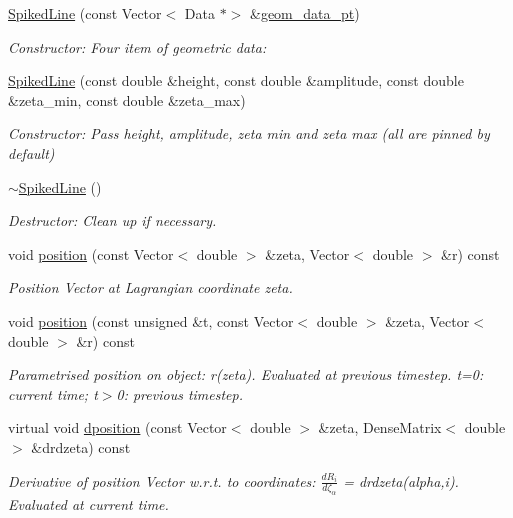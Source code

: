 \begin{DoxyCompactItemize}
\item 
\hyperlink{classSpikedLine_a79ca76b80aebb0b32f63c125aee9d04d}{Spiked\+Line} (const Vector$<$ Data $\ast$$>$ \&\hyperlink{classSpikedLine_abf25117b43790ca3a9afb826188bc5fc}{geom\+\_\+data\+\_\+pt})
\begin{DoxyCompactList}\small\item\em Constructor\+: Four item of geometric data\+: \end{DoxyCompactList}\item 
\hyperlink{classSpikedLine_ad007f4c54d091b1c4ddb4b63cef0e7b6}{Spiked\+Line} (const double \&height, const double \&amplitude, const double \&zeta\+\_\+min, const double \&zeta\+\_\+max)
\begin{DoxyCompactList}\small\item\em Constructor\+: Pass height, amplitude, zeta min and zeta max (all are pinned by default) \end{DoxyCompactList}\item 
\hyperlink{classSpikedLine_a54f1b8a7951ad8205741e78fc75afaa3}{$\sim$\+Spiked\+Line} ()
\begin{DoxyCompactList}\small\item\em Destructor\+: Clean up if necessary. \end{DoxyCompactList}\item 
void \hyperlink{classSpikedLine_a11a6078a409096caaf21dd56b97e1528}{position} (const Vector$<$ double $>$ \&zeta, Vector$<$ double $>$ \&r) const
\begin{DoxyCompactList}\small\item\em Position Vector at Lagrangian coordinate zeta. \end{DoxyCompactList}\item 
void \hyperlink{classSpikedLine_ac6356a30cad06346e46a494e226d5219}{position} (const unsigned \&t, const Vector$<$ double $>$ \&zeta, Vector$<$ double $>$ \&r) const
\begin{DoxyCompactList}\small\item\em Parametrised position on object\+: r(zeta). Evaluated at previous timestep. t=0\+: current time; t$>$0\+: previous timestep. \end{DoxyCompactList}\item 
virtual void \hyperlink{classSpikedLine_a8c7c95b0c572a33ca9206b01d10c99c5}{dposition} (const Vector$<$ double $>$ \&zeta, Dense\+Matrix$<$ double $>$ \&drdzeta) const
\begin{DoxyCompactList}\small\item\em Derivative of position Vector w.\+r.\+t. to coordinates\+: $ \frac{dR_i}{d \zeta_\alpha}$ = drdzeta(alpha,i). Evaluated at current time. \end{DoxyCompactList}\item 
$$
\end{DoxyCompactItemize}
